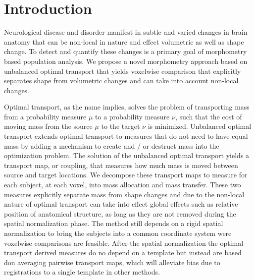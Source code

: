 \documentclass{llncs}
\begin{document}
\section{Introduction}
Neurological disease and disorder manifest in subtle and varied changes in
brain anatomy that can be non-local in nature and effect volumetric as well as
shape change. To detect and quantify these changes is a primary goal of
morphometry based population analysis. We propose a novel morphometry approach
based on unbalanced optimal transport that yields voxelwise comparison that
explicitly separates shape from volumetric changes and can take into account
non-local changes. 

Optimal transport, as the name implies, solves the problem of transporting mass
from a probability measure $\mu$ to a probability measure $\nu$, such that the
cost of moving mass from the source $\mu$ to the target $\nu$ is minimized.
Unbalanced optimal transport extends optimal transport to measures that do not
need to have equal mass by adding a mechanism to create and / or destruct mass
into the optimization problem. The solution of the unbalanced optimal transport
yields a transport map, or coupling, that measures how much mass is moved
between source and target locations. We decompose these transport maps to
measure for each subject, at each voxel, into mass allocation and mass
transfer. These two measures explicitly separate mass from shape changes and
due to the non-local nature of optimal transport can take into effect global
effects such as relative position of anatomical structure,  as long as they are
not removed during the spatial normalization phase. The method still depends on
a rigid spatial normalization to bring the subjects into a common coordinate
system were voxelwise comparisons are feasible. After the spatial normalization
the optimal transport derived measures do no depend on a template but instead
are based don averaging pairwise transport maps, which will alleviate bias due
to registrations to a single template  in other methods. 
\end{document}
